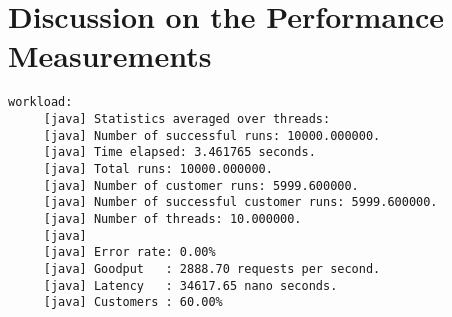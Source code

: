 \chapter{Discussion on the Performance Measurements}


\begin{verbatim}
workload:
     [java] Statistics averaged over threads:
     [java] Number of successful runs: 10000.000000.
     [java] Time elapsed: 3.461765 seconds.
     [java] Total runs: 10000.000000.
     [java] Number of customer runs: 5999.600000.
     [java] Number of successful customer runs: 5999.600000.
     [java] Number of threads: 10.000000.
     [java]
     [java] Error rate: 0.00%
     [java] Goodput   : 2888.70 requests per second.
     [java] Latency   : 34617.65 nano seconds.
     [java] Customers : 60.00%
\end{verbatim}
